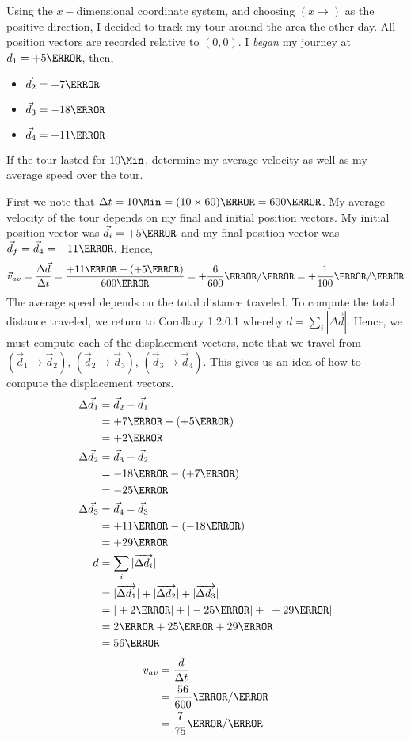 \documentclass[12pt]{article} %
\begin{document}
 \begin{qstn}[2]
    Using the $x-$dimensional coordinate system, and choosing $(x \rightarrow )$ as the positive direction, I decided to track my tour around the area the other day. All position vectors are recorded relative to $(0,0)$. I \emph{began} my journey at $d_1 = + 5 \m$, then,
    \begin{itemize}
        \item $\vec d_2 = + 7\m$
        \item $\vec d_3 = -18\m$
        \item $\vec d_4 = +11\m$
    \end{itemize}
    If the tour lasted for $10\Min$, determine my average velocity as well as my average speed over the tour.
    \begin{soln}
        First we note that $\Delta t = 10\Min = (10 \times 60) \s = 600 \s$. My average velocity of the tour depends on my final and initial position vectors. My initial position vector was $\vec d_i = +5\m$ and my final position vector was $\vec d_f = \vec d_4 = +11\m$. Hence,
        $$\vec v_{av} = \frac{\Delta \vec d}{\Delta t} = \frac{+11\m - (+5\m)}{600\s} = +\frac{6}{600} \m / \s = +\frac{1}{100} \m / \s$$
        The average speed depends on the total distance traveled. To compute the total distance traveled, we return to Corollary 1.2.0.1 whereby $d = \sum_i |\overrightarrow{\Delta d}|$. Hence, we must compute each of the displacement vectors, note that we travel from $(\vec d_1 \rightarrow \vec d_2)$, $(\vec d_2 \rightarrow \vec d_3)$, $(\vec d_3 \rightarrow \vec d_4)$. This gives us an idea of how to compute the displacement vectors.
        \begin{align*}
            \Delta \vec d_1 &= \vec d_2 - \vec d_1\\
            &= +7\m - (+5\m)\\
            &= +2\m\\
            \Delta \vec d_2 &= \vec d_3 - \vec d_2\\
            &= -18\m - (+7 \m)\\
            &= -25\m\\
            \Delta \vec d_3 &= \vec d_4 - \vec d_3\\
            &= +11\m - (-18\m)\\
            &= +29 \m\\
            d &= \sum_i |\overrightarrow{\Delta d_i}|\\
            &= |\overrightarrow{\Delta d_1}| + |\overrightarrow{\Delta d_2}| + |\overrightarrow{\Delta d_3}|\\
            &= |+2\m| + |-25\m| + |+29\m|\\
            &= 2\m + 25\m + 29\m\\
            &= 56\m
        \end{align*}
        \begin{align*}
            v_{av} &= \frac{d}{\Delta t}\\
            &= \frac{56}{600} \m / \s\\
            &= \frac{7}{75} \m / \s
        \end{align*}
    \end{soln}
 \end{qstn}
\end{document}
